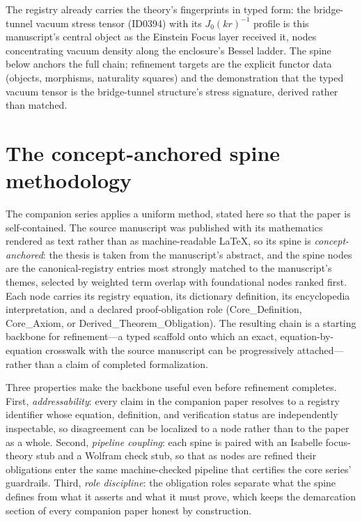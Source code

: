 \documentclass[11pt]{article}
\theoremstyle{remark}
\begin{document}
The registry already carries the theory's fingerprints in typed form: the bridge-tunnel vacuum stress tensor (ID0394) with its $J_0(kr)^{-1}$ profile is this manuscript's central object as the Einstein Focus layer received it, nodes concentrating vacuum density along the enclosure's Bessel ladder. The spine below anchors the full chain; refinement targets are the explicit functor data (objects, morphisms, naturality squares) and the demonstration that the typed vacuum tensor is the bridge-tunnel structure's stress signature, derived rather than matched.

\section{The concept-anchored spine methodology}
\label{sec:method}

The companion series applies a uniform method, stated here so that the paper is self-contained. The source manuscript was published with its mathematics rendered as text rather than as machine-readable LaTeX, so its spine is \emph{concept-anchored}: the thesis is taken from the manuscript's abstract, and the spine nodes are the canonical-registry entries most strongly matched to the manuscript's themes, selected by weighted term overlap with foundational nodes ranked first. Each node carries its registry equation, its dictionary definition, its encyclopedia interpretation, and a declared proof-obligation role (Core\_Definition, Core\_Axiom, or Derived\_Theorem\_Obligation). The resulting chain is a starting backbone for refinement---a typed scaffold onto which an exact, equation-by-equation crosswalk with the source manuscript can be progressively attached---rather than a claim of completed formalization.

Three properties make the backbone useful even before refinement completes. First, \emph{addressability}: every claim in the companion paper resolves to a registry identifier whose equation, definition, and verification status are independently inspectable, so disagreement can be localized to a node rather than to the paper as a whole. Second, \emph{pipeline coupling}: each spine is paired with an Isabelle focus-theory stub and a Wolfram check stub, so that as nodes are refined their obligations enter the same machine-checked pipeline that certifies the core series' guardrails. Third, \emph{role discipline}: the obligation roles separate what the spine defines from what it asserts and what it must prove, which keeps the demarcation section of every companion paper honest by construction.
\end{document}
